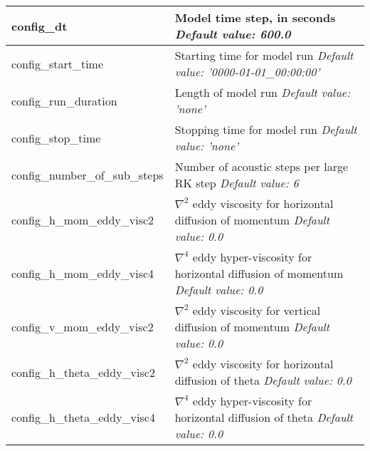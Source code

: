 {\small
\begin{longtable}{|p{1.75in} |p{4.5in}|}
 \hline   

   config\_dt & Model time step, in seconds \newline 
   {\em Default value: 600.0} \\ \hline

   config\_start\_time & Starting time for model run \newline 
   {\em Default value: '0000-01-01\_00:00:00'} \\ \hline

   config\_run\_duration & Length of model run \newline 
   {\em Default value: 'none'} \\ \hline

   config\_stop\_time  & Stopping time for model run \newline 
   {\em Default value: 'none'} \\ \hline

   config\_number\_of\_sub\_steps & Number of acoustic steps per large RK step \newline 
   {\em Default value: 6} \\ \hline

   config\_h\_mom\_eddy\_visc2 & $\nabla^2$ eddy viscosity for horizontal diffusion of momentum \newline 
   {\em Default value: 0.0} \\ \hline

   config\_h\_mom\_eddy\_visc4 & $\nabla^4$ eddy hyper-viscosity for horizontal diffusion of momentum \newline 
   {\em Default value: 0.0} \\ \hline

   config\_v\_mom\_eddy\_visc2 & $\nabla^2$ eddy viscosity for vertical diffusion of momentum \newline 
   {\em Default value: 0.0} \\ \hline

   config\_h\_theta\_eddy\_visc2 & $\nabla^2$ eddy viscosity for horizontal diffusion of theta \newline 
   {\em Default value: 0.0} \\ \hline

   config\_h\_theta\_eddy\_visc4 & $\nabla^4$ eddy hyper-viscosity for horizontal diffusion of theta \newline 
   {\em Default value: 0.0} \\ \hline


\end{longtable}}
